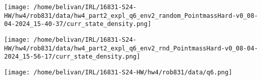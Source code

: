 \documentclass{article}
\begin{document}
\begin{answer}[title=Density Plot Pointmass Hard Random,height=9.5cm,width=\linewidth]
\centering
\texttt{[image: /home/belivan/IRL/16831-S24-HW/hw4/rob831/data/hw4\_part2\_expl\_q6\_env2\_random\_PointmassHard-v0\_08-04-2024\_15-40-37/curr\_state\_density.png]}
\end{answer}

\begin{answer}[title=Density Plot Pointmass Hard RND,height=9.5cm,width=\linewidth]
\centering
\texttt{[image: /home/belivan/IRL/16831-S24-HW/hw4/rob831/data/hw4\_part2\_expl\_q6\_env2\_rnd\_PointmassHard-v0\_08-04-2024\_15-56-17/curr\_state\_density.png]}
\end{answer}

\begin{answer}[title=Reward Return Plot for Pointmass Env (Easy and Hard),height=9.5cm,width=\linewidth]
\centering
\texttt{[image: /home/belivan/IRL/16831-S24-HW/hw4/rob831/data/q6.png]}
\end{answer}
\end{document}
